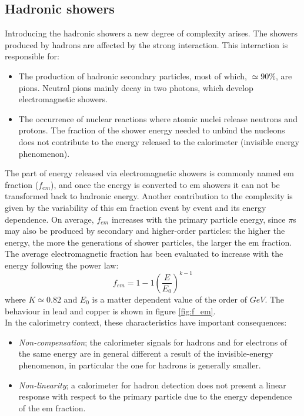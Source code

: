 \subsection{Hadronic showers} \label{subsec:had_shower}
Introducing the hadronic showers a new degree of complexity arises. The showers produced by hadrons are affected by the strong interaction. This interaction is responsible for:
\begin{itemize}
    \item The production of hadronic secondary particles, most of which, $\simeq 90\%$, are pions. Neutral pions mainly decay in two photons, which develop electromagnetic showers.
    \item The occurrence of nuclear reactions where atomic nuclei release neutrons and protons. The fraction of the shower energy needed to unbind the nucleons does not contribute to the energy released to the calorimeter (invisible energy phenomenon).
\end{itemize}
The part of energy released via electromagnetic showers is commonly named em fraction ($f_{em}$), and once the energy is converted to em showers it can not be transformed back to hadronic energy. Another contribution to the complexity is given by the variability of this em fraction event by event and its energy dependence. On average, $f_{em}$ increases with the primary particle energy, since $\pi$s may also be produced by secondary and higher-order particles: the higher the energy, the more the generations of shower particles, the larger the em fraction. The  average  electromagnetic fraction has been evaluated to increase with the energy following the power law:
\begin{equation}
    f_{em} = 1 -1\left(\frac{E}{E_0}\right)^{k-1}
\end{equation}
where $K\simeq 0.82$ and $E_0$ is a matter dependent value of the order of $GeV$. The behaviour in lead and copper is shown in figure \ref{fig:f_em}.\\
In the calorimetry context, these characteristics have important consequences:
\begin{itemize}
    \item \textit{Non-compensation}; the calorimeter signals for hadrons and for electrons of the same energy are in general different a result of the invisible-energy phenomenon, in particular the one for hadrons is generally smaller.
    \item \textit{Non-linearity}; a calorimeter for hadron detection does not present a linear response with respect to the primary particle due to the energy dependence of the em fraction.
\end{itemize}

